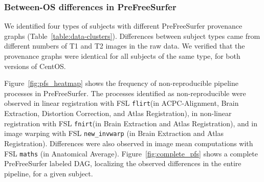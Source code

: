 \documentclass[a4paper,num-refs]{oup-contemporary}
\newcommand{\flirt}[0]{\texttt{flirt}\xspace}
\newcommand{\fnirt}[0]{\texttt{fnirt}\xspace}
\begin{document}
\subsubsection{Between-OS differences in PreFreeSurfer}

We identified four types of subjects with different PreFreeSurfer
provenance graphs (Table~\ref{table:data-clusters}). Differences between
subject types came from different numbers of T1 and T2 images in the
raw data. We verified that
the provenance graphs were identical for all subjects of the same type, for
both versions of CentOS.

Figure~\ref{fig:pfs_heatmap} shows the frequency of non-reproducible pipeline processes
in PreFreeSurfer. 
The processes identified as non-reproducible were observed in linear registration 
with FSL \flirt (in ACPC-Alignment, Brain Extraction, Distortion Correction, and
Atlas Registration), in non-linear registration with FSL \fnirt (in Brain Extraction 
and Atlas Registration), and in image warping with FSL \texttt{new\_invwarp} (in Brain Extraction 
and Atlas Registration). Differences were also observed in image mean 
computations with FSL \texttt{maths}  (in Anatomical Average). 
Figure~\ref{fig:complete_pfs} shows a complete PreFreeSurfer labeled DAG, localizing 
the observed differences in the entire pipeline, for a given subject.
\end{document}
